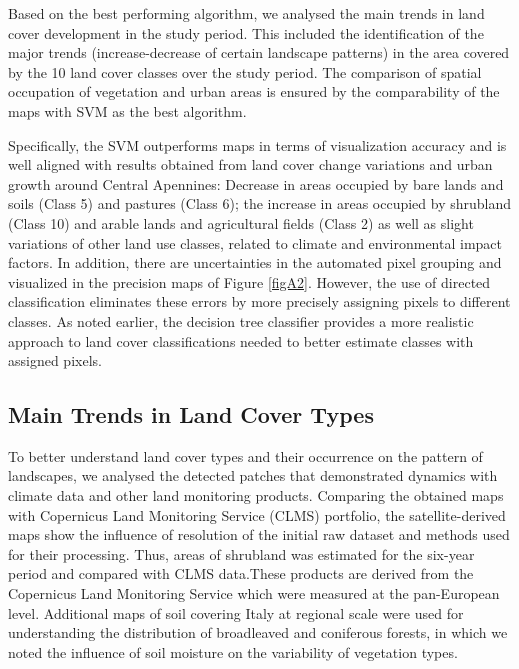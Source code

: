 \documentclass[jimaging,article,accept,pdftex,oneauthor]{Definitions/mdpi}
\begin{document}
Based on the best performing algorithm, we analysed the main trends in land cover development in the study period. This included the identification of the major trends (increase-decrease of certain landscape patterns) in the area covered by the 10 land cover classes over the study period. The comparison of spatial occupation of vegetation and urban areas is ensured by the comparability of the maps with SVM as the best algorithm. 

{Specifically, }the SVM outperforms maps in terms of visualization accuracy and is well aligned with results obtained from land cover change variations and urban growth around Central Apennines: Decrease in areas occupied by bare lands and soils (Class 5) and pastures (Class 6); the increase in areas occupied by shrubland (Class 10) and arable lands and agricultural fields (Class 2) as well as slight variations of other land use classes, related to climate and environmental impact factors. In addition, there are uncertainties in the automated pixel grouping{ }and visualized in the precision maps of Figure \ref{figA2}. However, the use of directed classification eliminates these errors by more precisely assigning pixels to different classes. As noted earlier, the decision tree classifier{ }provides a more realistic approach to land cover classifications needed to better estimate classes with assigned pixels.


\subsection{Main Trends in Land Cover Types}

To better understand land cover types and their occurrence on the pattern of landscapes, we analysed the detected patches that demonstrated dynamics with climate data and other land monitoring products. Comparing the obtained maps with Copernicus Land Monitoring Service (CLMS) portfolio, the satellite-derived maps show the influence of resolution of the initial raw dataset and methods used for their processing. Thus, areas of shrubland was  estimated for the six-year period and compared with CLMS data.These products are derived from the Copernicus Land Monitoring Service  which were measured at the pan-European level. Additional maps of soil covering Italy at regional scale were used for understanding the distribution of broadleaved and coniferous forests, in which we noted the influence of soil moisture on the variability of vegetation types. 
\end{document}
